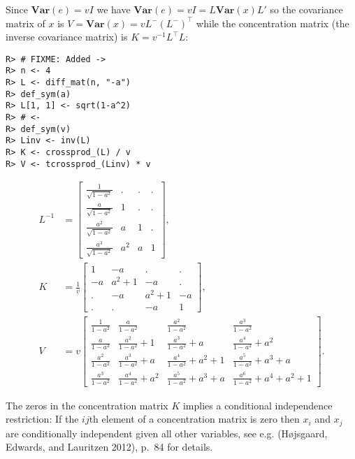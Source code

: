 Since
\(\mathbf{Var}(e)=v I\) we have \(\mathbf{Var}(e)=v I=L \mathbf{Var}(x) L'\) so the covariance matrix of \(x\) is \(V=\mathbf{Var}(x) = v L^- (L^-)^\top\) while the concentration matrix (the inverse covariance
matrix) is \(K=v^{-1}L^\top L\):

\begin{verbatim}
R> # FIXME: Added ->
R> n <- 4
R> L <- diff_mat(n, "-a")
R> def_sym(a)
R> L[1, 1] <- sqrt(1-a^2)
R> # <-
R> def_sym(v)
R> Linv <- inv(L)
R> K <- crossprod_(L) / v
R> V <- tcrossprod_(Linv) * v
\end{verbatim}

\begin{align} 
    L^{-1} &= \left[\begin{matrix}\frac{1}{\sqrt{1 - a^{2}}} & . & . & .\\\frac{a}{\sqrt{1 - a^{2}}} & 1 & . & .\\\frac{a^{2}}{\sqrt{1 - a^{2}}} & a & 1 & .\\\frac{a^{3}}{\sqrt{1 - a^{2}}} & a^{2} & a & 1\end{matrix}\right] , \\ 
    K &= \frac{1}{v}  \left[\begin{matrix}1 & - a & . & .\\- a & a^{2} + 1 & - a & .\\. & - a & a^{2} + 1 & - a\\. & . & - a & 1\end{matrix}\right] , \\ 
    V &= v  \left[\begin{matrix}\frac{1}{1 - a^{2}} & \frac{a}{1 - a^{2}} & \frac{a^{2}}{1 - a^{2}} & \frac{a^{3}}{1 - a^{2}}\\\frac{a}{1 - a^{2}} & \frac{a^{2}}{1 - a^{2}} + 1 & \frac{a^{3}}{1 - a^{2}} + a & \frac{a^{4}}{1 - a^{2}} + a^{2}\\\frac{a^{2}}{1 - a^{2}} & \frac{a^{3}}{1 - a^{2}} + a & \frac{a^{4}}{1 - a^{2}} + a^{2} + 1 & \frac{a^{5}}{1 - a^{2}} + a^{3} + a\\\frac{a^{3}}{1 - a^{2}} & \frac{a^{4}}{1 - a^{2}} + a^{2} & \frac{a^{5}}{1 - a^{2}} + a^{3} + a & \frac{a^{6}}{1 - a^{2}} + a^{4} + a^{2} + 1\end{matrix}\right]  .
  \end{align}

The zeros in the concentration matrix \(K\) implies a conditional
independence restriction: If the \(ij\)th element of a concentration
matrix is zero then \(x_i\) and \(x_j\) are conditionally independent
given all other variables, see e.g. (Højsgaard, Edwards, and Lauritzen 2012), p.~84 for
details.


